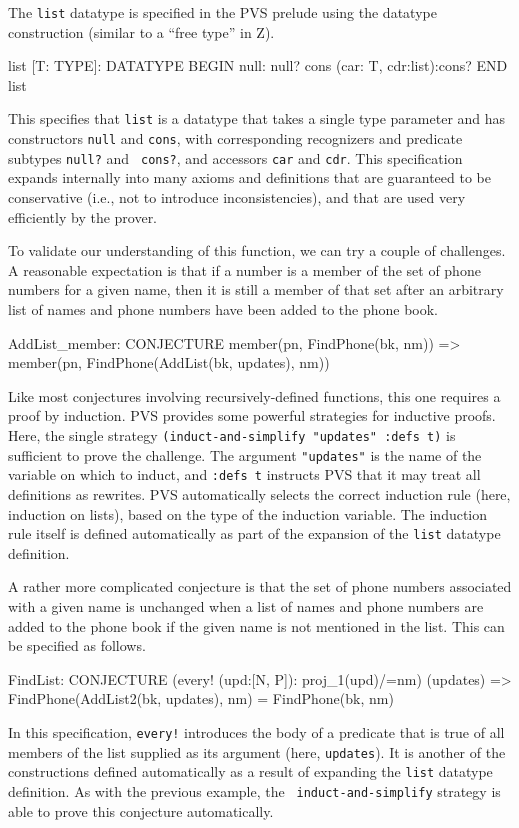 The {\tt list} datatype is specified in the PVS prelude using the
datatype construction (similar to a ``free type'' in Z).
\begin{pvsexample}
list [T: TYPE]: DATATYPE 
 BEGIN
  null: null?
  cons (car: T, cdr:list):cons?
 END list
\end{pvsexample}
This specifies that {\tt list} is a datatype that takes a single type
parameter and has constructors {\tt null} and {\tt cons}, with
corresponding recognizers and predicate subtypes {\tt null?} and {\tt
cons?}, and accessors {\tt car} and {\tt cdr}.  This specification
expands internally into many axioms and definitions that are
guaranteed to be conservative (i.e., not to introduce
inconsistencies), and that are used very efficiently by the prover.

To validate our understanding of this function, we can try a couple of
challenges.  A reasonable expectation is that if a number is a member
of the set of phone numbers for a given name, then it is still a member
of that set after an arbitrary list of names and phone numbers have
been added to the phone book.
\begin{pvsexample}
AddList_member: CONJECTURE
  member(pn, FindPhone(bk, nm)) =>
     member(pn, FindPhone(AddList(bk, updates), nm))
\end{pvsexample}
Like most conjectures involving recursively-defined functions, this
one requires a proof by induction.  PVS provides some powerful
strategies for inductive proofs.  Here, the single strategy
{\tt (induct-and-simplify "updates" :defs t)}
is sufficient to prove the challenge.  The argument {\tt "updates"} is
the name of the variable on which to induct, and {\tt :defs t}
instructs PVS that it may treat all definitions as rewrites.  PVS
automatically selects the correct induction rule (here, induction on
lists), based on the type of the induction variable.  The induction
rule itself is defined automatically as part of the expansion of the
{\tt list} datatype definition.

A rather more complicated conjecture is that the set of phone numbers
associated with a given name is unchanged when a list of names and
phone numbers are added to the phone book if the given name is not
mentioned in the list.  This can be specified as follows.
\begin{pvsexample}
FindList: CONJECTURE
  (every! (upd:[N, P]): proj_1(upd)/=nm) (updates) =>
    FindPhone(AddList2(bk, updates), nm) = FindPhone(bk, nm)
\end{pvsexample}
In this specification, {\tt every!} introduces the body of a predicate
that is true of all members of the list supplied as its argument
(here, {\tt updates}).  It is another of the constructions defined
automatically as a result of expanding the {\tt list} datatype
definition.  As with the previous example, the {\tt
induct-and-simplify} strategy is able to prove this conjecture
automatically.

